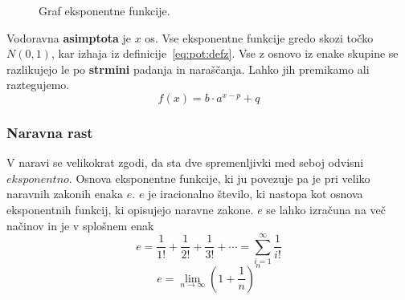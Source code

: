 \documentclass[a4paper,oneside,12pt,fleqn]{article}
\newcommand\krat\cdot
\newcommand{\beforecaptionskip}{\vspace{-12pt}}
\def\limi{\displaystyle\lim_{n\to\infty}} %
\numberwithin{equation}{section}
\begin{document}
\begin{figure}[ht]
  \begin{center}
  \end{center}
  \beforecaptionskip
  \caption{Graf eksponentne funkcije.}
  \label{fig:fun:eks:graf}
\end{figure}

Vodoravna \textbf{asimptota} je $x$ os. Vse eksponentne funkcije gredo skozi točko $N(0,1)$, kar
izhaja iz definicije~\eqref{eq:pot:defz}. Vse z osnovo iz enake skupine se razlikujejo le
po \textbf{strmini} padanja in naraščanja. Lahko jih premikamo ali raztegujemo.
\[ f(x) = b\krat a^{x-p} + q \]

\subsubsection{Naravna rast}
V naravi se velikokrat zgodi, da sta dve spremenljivki med seboj odvisni $eksponentno$. Osnova
eksponentne funkcije, ki ju povezuje pa je pri veliko naravnih zakonih enaka $e$. $e$ je iracionalno
število, ki nastopa kot osnova eksponentnih funkcij, ki opisujejo naravne zakone. $e$ se lahko
izračuna na več načinov in je v splošnem enak
\[ e = \frac{1}{1!} + \frac{1}{2!} + \frac{1}{3!} + \cdots = \sum_{i=1}^\infty\frac{1}{i!} \]
\[ e = \limi\left( 1+\frac{1}{n} \right)^n \]
\end{document}
